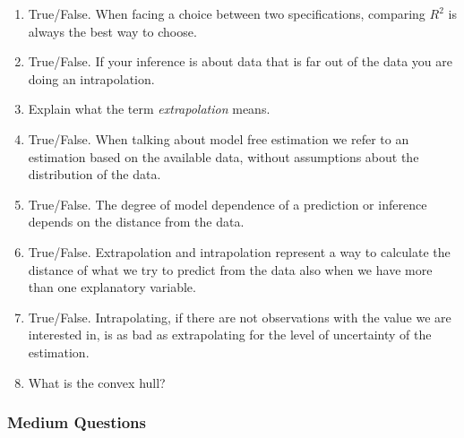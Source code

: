 \documentclass[11pt]{article}
\begin{document}
\begin{enumerate}
\item True/False. When facing a choice between two specifications, comparing $R^2$ is always the best way to choose.
\item True/False. If your inference is about data that is far out of the data you are doing an intrapolation.
\item Explain what the term \textit{extrapolation} means.
\item True/False. When talking about model free estimation we refer to an estimation based on the available data, without assumptions about the distribution of the data.
\item True/False. The degree of model dependence of a prediction or inference depends on the distance from the data.
\item True/False. Extrapolation and intrapolation represent a way to calculate  the distance of what we try to predict from the data also when we have more than one explanatory variable.
\item True/False. Intrapolating, if there are not observations with the value we are interested in, is as bad as extrapolating for the level of uncertainty of the estimation.
\item What is the convex hull?

\end{enumerate}


\subsubsection{Medium Questions}
\end{document}
